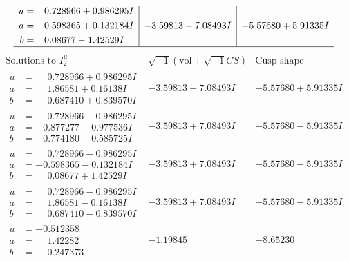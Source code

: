 \documentclass[1p]{elsarticle_modified}
\theoremstyle{definition}
\newcommand{\I}{\sqrt{-1}}
\begin{document}
$$\begin{array}{c|c|c}
\begin{aligned}
u &= \phantom{-}0.728966 + 0.986295 I \\
a &= -0.598365 + 0.132184 I \\
b &= \phantom{-}0.08677 - 1.42529 I\end{aligned}
 & -3.59813 - 7.08493 I & -5.57680 + 5.91335 I\\
 \hline 
 \end{array}$$\newpage$$\begin{array}{c|c|c}  
\text{Solutions to }I^u_{2}& \I (\text{vol} + \sqrt{-1}CS) & \text{Cusp shape}\\
 \hline 
\begin{aligned}
u &= \phantom{-}0.728966 + 0.986295 I \\
a &= \phantom{-}1.86581 + 0.16138 I \\
b &= \phantom{-}0.687410 + 0.839570 I\end{aligned}
 & -3.59813 - 7.08493 I & -5.57680 + 5.91335 I \\ \hline\begin{aligned}
u &= \phantom{-}0.728966 - 0.986295 I \\
a &= -0.877277 - 0.977536 I \\
b &= -0.774180 - 0.585725 I\end{aligned}
 & -3.59813 + 7.08493 I & -5.57680 - 5.91335 I \\ \hline\begin{aligned}
u &= \phantom{-}0.728966 - 0.986295 I \\
a &= -0.598365 - 0.132184 I \\
b &= \phantom{-}0.08677 + 1.42529 I\end{aligned}
 & -3.59813 + 7.08493 I & -5.57680 - 5.91335 I \\ \hline\begin{aligned}
u &= \phantom{-}0.728966 - 0.986295 I \\
a &= \phantom{-}1.86581 - 0.16138 I \\
b &= \phantom{-}0.687410 - 0.839570 I\end{aligned}
 & -3.59813 + 7.08493 I & -5.57680 - 5.91335 I \\ \hline\begin{aligned}
u &= -0.512358\phantom{ +0.000000I} \\
a &= \phantom{-}1.42282\phantom{ +0.000000I} \\
b &= \phantom{-}0.247373\phantom{ +0.000000I}\end{aligned}
 & -1.19845\phantom{ +0.000000I} & -8.65230\phantom{ +0.000000I} \\ \hline\begin{aligned}

\end{aligned}
\end{array}$$
\end{document}
